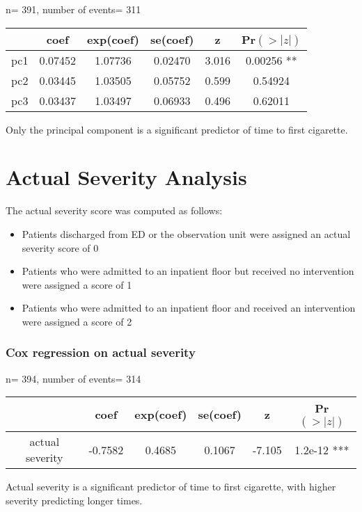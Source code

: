 \documentclass[12pt]{article}
\begin{document}
  n= 391, number of events= 311
\par\vspace{0.3 cm}
\begin{tabular}{cccccc}
    &     coef & exp(coef) &  se(coef) & z   & Pr$(>|z|)$\\
\hline  
pc1& 0.07452&   1.07736&  0.02470& 3.016&  0.00256 **\\
pc2& 0.03445&   1.03505&  0.05752& 0.599&  0.54924\\   
pc3& 0.03437&   1.03497&  0.06933& 0.496&  0.62011   
\end{tabular}
\par\vspace{0.3 cm}
Only the principal component is a significant predictor of time to first cigarette.
\par\vspace{0.3 cm}

\section*{Actual Severity Analysis}
\par\vspace{0.3 cm}
The actual severity score was computed as follows:
\begin{itemize}
\item Patients discharged from ED or the observation unit were assigned an actual severity score of 0
\item Patients who were admitted to an inpatient floor but received no intervention were assigned a score of 1
\item Patients who were admitted to an inpatient floor and received an intervention were assigned a score of 2
\end{itemize}
\par\vspace{0.3 cm}
\subsubsection*{Cox regression on actual severity}

  n= 394, number of events= 314
\par\vspace{0.3 cm}
\begin{tabular}{cccccc}
    &     coef & exp(coef) &  se(coef) & z   & Pr$(>|z|)$\\
\hline  
actual severity& -0.7582&    0.4685&   0.1067& -7.105&  1.2e-12 ***
\end{tabular}
\par\vspace{0.3 cm}
Actual severity is a significant predictor of time to first cigarette, with higher severity predicting longer times.
\par\vspace{0.3 cm}
\end{document}

